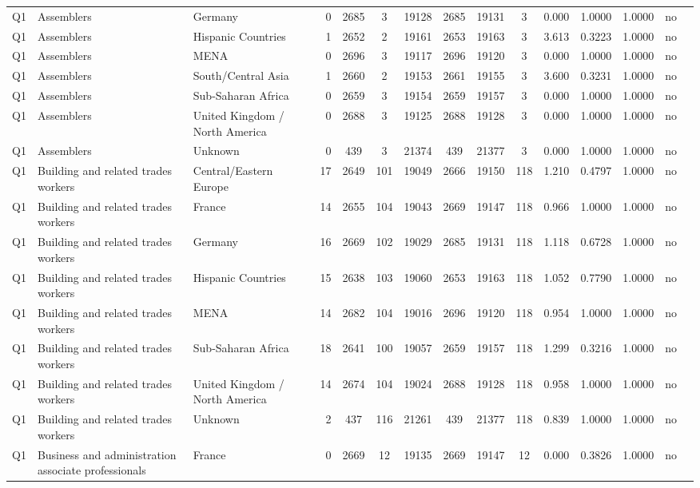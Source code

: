 \begin{longtable}{lllrcccccccccll}
Q1 & Assemblers & Germany & 0 & 2685 & 3 & 19128 & 2685 & 19131 & 3 & 0.000 & 1.0000 & 1.0000 & no \\
Q1 & Assemblers & Hispanic Countries & 1 & 2652 & 2 & 19161 & 2653 & 19163 & 3 & 3.613 & 0.3223 & 1.0000 & no \\
Q1 & Assemblers & MENA & 0 & 2696 & 3 & 19117 & 2696 & 19120 & 3 & 0.000 & 1.0000 & 1.0000 & no \\
Q1 & Assemblers & South/Central Asia & 1 & 2660 & 2 & 19153 & 2661 & 19155 & 3 & 3.600 & 0.3231 & 1.0000 & no \\
Q1 & Assemblers & Sub-Saharan Africa & 0 & 2659 & 3 & 19154 & 2659 & 19157 & 3 & 0.000 & 1.0000 & 1.0000 & no \\
Q1 & Assemblers & United Kingdom / North America & 0 & 2688 & 3 & 19125 & 2688 & 19128 & 3 & 0.000 & 1.0000 & 1.0000 & no \\
Q1 & Assemblers & Unknown & 0 & 439 & 3 & 21374 & 439 & 21377 & 3 & 0.000 & 1.0000 & 1.0000 & no \\
Q1 & Building and related trades workers & Central/Eastern Europe & 17 & 2649 & 101 & 19049 & 2666 & 19150 & 118 & 1.210 & 0.4797 & 1.0000 & no \\
Q1 & Building and related trades workers & France & 14 & 2655 & 104 & 19043 & 2669 & 19147 & 118 & 0.966 & 1.0000 & 1.0000 & no \\
Q1 & Building and related trades workers & Germany & 16 & 2669 & 102 & 19029 & 2685 & 19131 & 118 & 1.118 & 0.6728 & 1.0000 & no \\
Q1 & Building and related trades workers & Hispanic Countries & 15 & 2638 & 103 & 19060 & 2653 & 19163 & 118 & 1.052 & 0.7790 & 1.0000 & no \\
Q1 & Building and related trades workers & MENA & 14 & 2682 & 104 & 19016 & 2696 & 19120 & 118 & 0.954 & 1.0000 & 1.0000 & no \\
Q1 & Building and related trades workers & Sub-Saharan Africa & 18 & 2641 & 100 & 19057 & 2659 & 19157 & 118 & 1.299 & 0.3216 & 1.0000 & no \\
Q1 & Building and related trades workers & United Kingdom / North America & 14 & 2674 & 104 & 19024 & 2688 & 19128 & 118 & 0.958 & 1.0000 & 1.0000 & no \\
Q1 & Building and related trades workers & Unknown & 2 & 437 & 116 & 21261 & 439 & 21377 & 118 & 0.839 & 1.0000 & 1.0000 & no \\
Q1 & Business and administration associate professionals & France & 0 & 2669 & 12 & 19135 & 2669 & 19147 & 12 & 0.000 & 0.3826 & 1.0000 & no \\

\end{longtable}
